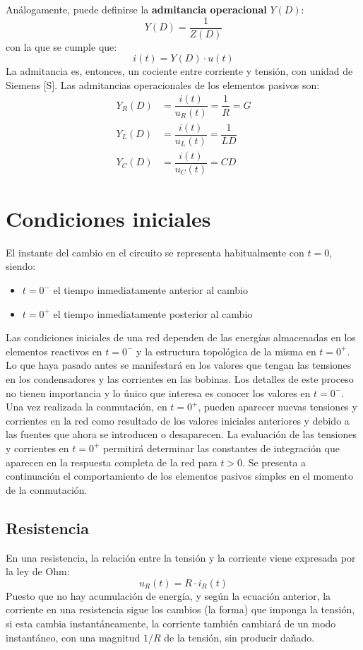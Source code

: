 	Análogamente, puede definirse la \textbf{admitancia operacional} $Y(D)$:
	\begin{equation*}
		Y(D)=\dfrac{1}{Z(D)}
	\end{equation*}
	con la que se cumple que:
	\begin{equation*}
		i(t)=Y(D)\cdot u(t)
	\end{equation*}
	La admitancia es, entonces, un cociente entre corriente y tensión, con unidad de Siemens [S]. Las admitancias operacionales de los elementos pasivos son: 
	\begin{align*}
		Y_R(D)&=\dfrac{i(t)}{u_R(t)}=\dfrac{1}{R}=G\\
		Y_L(D)&=\dfrac{i(t)}{u_L(t)}=\dfrac{1}{LD}\\
		Y_C(D)&=\dfrac{i(t)}{u_C(t)}=CD
	\end{align*} 

	\section{Condiciones iniciales}\label{sec.condiciones_iniciales}
	
	El instante del cambio en el circuito se representa habitualmente con $t = 0$, siendo:
    \begin{itemize}
    \item $t = 0^-$ el tiempo inmediatamente anterior al cambio
    \item $t = 0^+$ el tiempo inmediatamente posterior al cambio
    \end{itemize}
	Las condiciones iniciales de una red dependen de las energías almacenadas en los elementos reactivos en $t=0^-$ y la estructura topológica de la misma en $t=0^+$. Lo que haya pasado antes se manifestará en los valores que tengan las tensiones en los condensadores y las corrientes en las bobinas. Los detalles de este proceso no tienen importancia y lo único que interesa es conocer los valores en $t=0^-$. Una vez realizada la conmutación, en $t=0^+$, pueden aparecer nuevas tensiones y corrientes en la red como resultado de los valores iniciales anteriores y debido a las fuentes que ahora se introducen o desaparecen. La evaluación de las tensiones y corrientes en $t=0^+$ permitirá determinar las constantes de integración que aparecen en la respuesta completa de la red para $t>0$. Se presenta a continuación el comportamiento de los elementos pasivos simples en el momento de la conmutación.
	
	\subsection{Resistencia}
	En una resistencia, la relación entre la tensión y la corriente viene expresada por la ley de Ohm:
	\begin{equation*}
		u_R(t)=R\cdot i_R(t)
	\end{equation*}
	Puesto que no hay acumulación de energía, y según la ecuación anterior, la corriente en una resistencia sigue los cambios (la forma) que imponga la tensión, si esta cambia instantáneamente, la corriente también cambiará de un modo instantáneo, con una magnitud $1/R$ de la tensión, sin producir dañado. 
	
